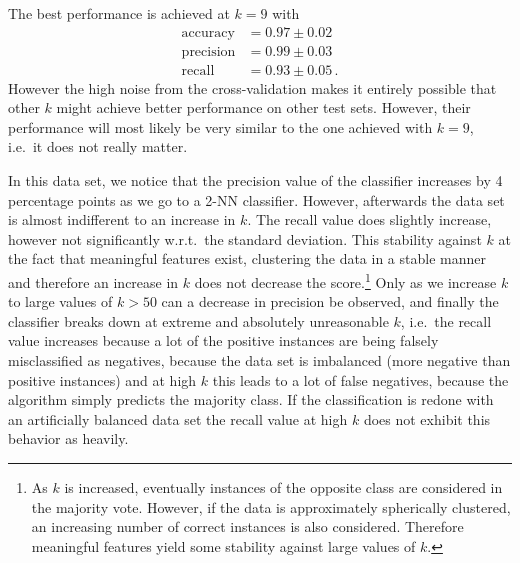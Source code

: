 \documentclass[12pt, a4paper]{scrartcl}
\begin{document}
The best performance is achieved at $k=9$ with 
\begin{align*}
	\text{accuracy} &= 0.97 \pm 0.02 \\
	\text{precision} &= 0.99 \pm 0.03 \\
	\text{recall} &= 0.93 \pm 0.05 \, .
\end{align*}
However the high noise from the cross-validation makes it entirely possible that other $k$ might achieve better performance on other test sets. However, their performance will most likely be very similar to the one achieved with $k=9$, i.e.\  it does not really matter.

In this data set, we notice that the precision value of the classifier increases by 4 percentage points as we go to a 2-NN classifier. However, afterwards the data set is almost indifferent to an increase in $k$.  The recall value does slightly increase, however not significantly w.r.t.\ the standard deviation. This stability against $k$ at the fact that meaningful features exist, clustering the data in a stable manner and therefore an increase in $k$ does not decrease the score.\footnote{As $k$ is increased, eventually instances of the opposite class are considered in the majority vote. However, if the data is approximately spherically clustered, an increasing number of correct instances is also considered. Therefore meaningful features yield some stability against large values of $k$.}
Only as we increase $k$ to large values of $k>50$ can a decrease in precision be observed, and finally the classifier breaks down at extreme and absolutely unreasonable $k$, i.e.\  the recall value increases because a lot of the positive instances are being falsely misclassified as negatives, because the data set is imbalanced (more negative than positive instances) and at high $k$ this leads to a lot of false negatives, because the algorithm simply predicts the majority class. If the classification is redone with an artificially balanced data set the recall value at high $k$ does not exhibit this behavior as heavily.
\end{document}
